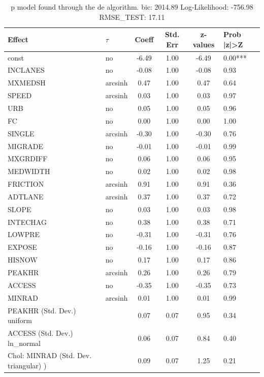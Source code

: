 \begin{table}
	\caption{p model found through the de algorithm. bic: 2014.89 Log-Likelihood: -756.98 RMSE_TEST: 17.11}
	\begin{center}
		\begin{tabular}{|l|l|c|c|c|l|}
			\hline
			Effect & $\tau$ & Coeff & Std. Err & z-values & Prob |z|>Z \\
			\hline
			const & no & -6.49 & 1.00 & -6.49 & 0.00*** \\
			\hline
			INCLANES & no & -0.08 & 1.00 & -0.08 & 0.93 \\
			\hline
			MXMEDSH & arcsinh & 0.47 & 1.00 & 0.47 & 0.64 \\
			\hline
			SPEED & arcsinh & 0.03 & 1.00 & 0.03 & 0.97 \\
			\hline
			URB & no & 0.05 & 1.00 & 0.05 & 0.96 \\
			\hline
			FC & no & 0.00 & 1.00 & 0.00 & 1.00 \\
			\hline
			SINGLE & arcsinh & -0.30 & 1.00 & -0.30 & 0.76 \\
			\hline
			MIGRADE & no & -0.01 & 1.00 & -0.01 & 0.99 \\
			\hline
			MXGRDIFF & no & 0.06 & 1.00 & 0.06 & 0.95 \\
			\hline
			MEDWIDTH & no & 0.02 & 1.00 & 0.02 & 0.98 \\
			\hline
			FRICTION & arcsinh & 0.91 & 1.00 & 0.91 & 0.36 \\
			\hline
			ADTLANE & arcsinh & 0.37 & 1.00 & 0.37 & 0.72 \\
			\hline
			SLOPE & no & 0.03 & 1.00 & 0.03 & 0.98 \\
			\hline
			INTECHAG & no & 0.38 & 1.00 & 0.38 & 0.71 \\
			\hline
			LOWPRE & no & -0.31 & 1.00 & -0.31 & 0.76 \\
			\hline
			EXPOSE & no & -0.16 & 1.00 & -0.16 & 0.87 \\
			\hline
			HISNOW & no & 0.17 & 1.00 & 0.17 & 0.86 \\
			\hline
			PEAKHR & arcsinh & 0.26 & 1.00 & 0.26 & 0.79 \\
			\hline
			ACCESS & no & -0.35 & 1.00 & -0.35 & 0.73 \\
			\hline
			MINRAD & arcsinh & 0.01 & 1.00 & 0.01 & 0.99 \\
			\hline
			PEAKHR (Std. Dev.) uniform &  & 0.07 & 0.07 & 0.95 & 0.34 \\
			\hline
			ACCESS (Std. Dev.) ln_normal &  & 0.06 & 0.07 & 0.84 & 0.40 \\
			\hline
			 Chol: MINRAD (Std. Dev. triangular) ) &  & 0.09 & 0.07 & 1.25 & 0.21 \\
			\hline
		\end{tabular}
	\end{center}
\end{table}